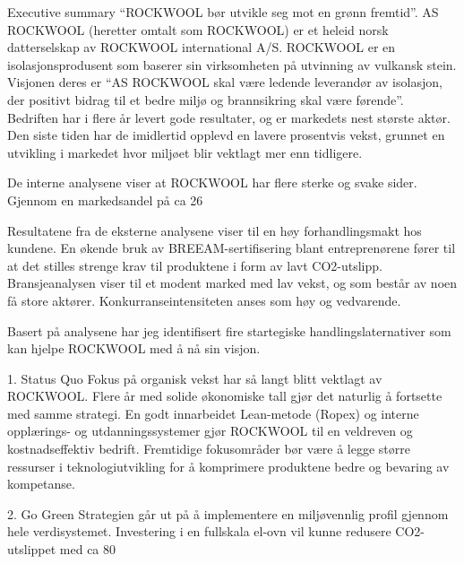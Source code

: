 Executive summary
“ROCKWOOL bør utvikle seg mot en grønn fremtid”.
AS ROCKWOOL (heretter omtalt som ROCKWOOL) er et heleid norsk datterselskap av ROCKWOOL international A/S. ROCKWOOL er en isolasjonsprodusent som baserer sin virksomheten på utvinning av vulkansk stein. Visjonen deres er “AS ROCKWOOL skal være ledende leverandør av isolasjon, der positivt bidrag til et bedre miljø og brannsikring skal være førende”. Bedriften har i flere år levert gode resultater, og er markedets nest største aktør. Den siste tiden har de imidlertid opplevd en lavere prosentvis vekst, grunnet en utvikling i markedet hvor miljøet blir vektlagt mer enn tidligere.

De interne analysene viser at ROCKWOOL har flere sterke og svake sider. Gjennom en markedsandel på ca 26%

Resultatene fra de eksterne analysene viser til en høy forhandlingsmakt hos kundene. En økende bruk av BREEAM-sertifisering blant entreprenørene fører til at det stilles strenge krav til produktene i form av lavt CO2-utslipp. Bransjeanalysen viser til et modent marked med lav vekst, og som består av noen få store aktører. Konkurranseintensiteten anses som høy og vedvarende. 

Basert på analysene har jeg identifisert fire startegiske handlingslaternativer som kan hjelpe ROCKWOOL med å nå sin visjon.

1. Status Quo
Fokus på organisk vekst har så langt blitt vektlagt av ROCKWOOL. Flere år med solide økonomiske tall gjør det naturlig å fortsette med samme strategi. En godt innarbeidet Lean-metode (Ropex) og interne opplærings- og utdanningssystemer gjør ROCKWOOL til en veldreven og kostnadseffektiv bedrift. Fremtidige fokusområder bør være å legge større ressurser i teknologiutvikling for å komprimere produktene bedre og bevaring av kompetanse. 

2. Go Green
Strategien går ut på å implementere en miljøvennlig profil gjennom hele verdisystemet. Investering i en fullskala el-ovn vil kunne redusere CO2-utslippet med ca 80%

